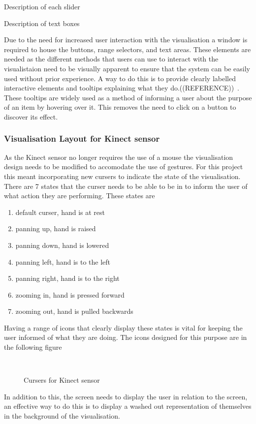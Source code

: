 Description of each slider

Description of text boxes

Due to the need for increased user interaction with the visualisation a window is required to house the buttons, range selectors, and text areas. These elements are needed as the different methods that users can use to interact with the visualistaion need to be visually apparent to ensure that the system can be easily used without prior experience. A way to do this is to provide clearly labelled interactive elements and tooltips explaining what they do.((REFERENCE))~. These tooltips are widely used as a method of informing a user about the purpose of an item by hovering over it. This removes the need to click on a button to discover its effect.

\subsubsection{Visualisation Layout for Kinect sensor}
As the Kinect sensor no longer requires the use of a mouse the visualisation design needs to be modified to accomodate the use of gestures. For this project this meant incorporating new cursers to indicate the state of the visualisation. There are 7 states that the curser needs to be able to be in to inform the user of what action they are performing. These states are

\begin{enumerate}
 \item default curser, hand is at rest
 \item panning up, hand is raised
 \item panning down, hand is lowered
 \item panning left, hand is to the left
 \item panning right, hand is to the right
 \item zooming in, hand is pressed forward
 \item zooming out, hand is pulled backwards
\end{enumerate}

Having a range of icons that clearly display these states is vital for keeping the user informed of what they are doing. The icons designed for this purpose are in the following figure

\begin{figure}[h!]
  \centering
  ~
  \caption{Cursers for Kinect sensor}  
\end{figure}

In addition to this, the screen needs to display the user in relation to the screen, an effective way to do this is to display a washed out representation of themselves in the background of the visualisation. 